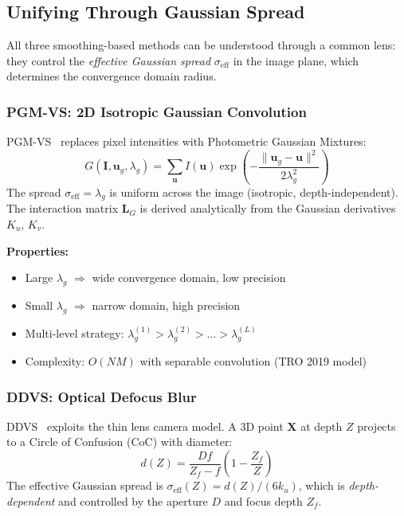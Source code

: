 \documentclass[11pt]{article}
\begin{document}
\subsection{Unifying Through Gaussian Spread}

All three smoothing-based methods can be understood through a common lens: they control the \emph{effective Gaussian spread} $\sigma_{\text{eff}}$ in the image plane, which determines the convergence domain radius.

\subsubsection{PGM-VS: 2D Isotropic Gaussian Convolution}

PGM-VS~\cite{crombez2019tro} replaces pixel intensities with Photometric Gaussian Mixtures:
\begin{equation}
    G(\mathbf{I}, \mathbf{u}_g, \lambda_g) = \sum_{\mathbf{u}} I(\mathbf{u}) \exp\left( -\frac{\|\mathbf{u}_g - \mathbf{u}\|^2}{2\lambda_g^2} \right)
\end{equation}
The spread $\sigma_{\text{eff}} = \lambda_g$ is uniform across the image (isotropic, depth-independent). The interaction matrix $\mathbf{L}_G$ is derived analytically from the Gaussian derivatives $K_u$, $K_v$.

\textbf{Properties:}
\begin{itemize}
    \item Large $\lambda_g$ $\Rightarrow$ wide convergence domain, low precision
    \item Small $\lambda_g$ $\Rightarrow$ narrow domain, high precision
    \item Multi-level strategy: $\lambda_g^{(1)} > \lambda_g^{(2)} > \ldots > \lambda_g^{(L)}$
    \item Complexity: $O(NM)$ with separable convolution (TRO 2019 model)
\end{itemize}

\subsubsection{DDVS: Optical Defocus Blur}

DDVS~\cite{caron2021ral} exploits the thin lens camera model. A 3D point $\mathbf{X}$ at depth $Z$ projects to a Circle of Confusion (CoC) with diameter:
\begin{equation}
    d(Z) = \frac{Df}{Z_f - f} \left( 1 - \frac{Z_f}{Z} \right)
\end{equation}
The effective Gaussian spread is $\sigma_{\text{eff}}(Z) = d(Z) / (6 k_u)$, which is \emph{depth-dependent} and controlled by the aperture $D$ and focus depth $Z_f$.
\end{document}

